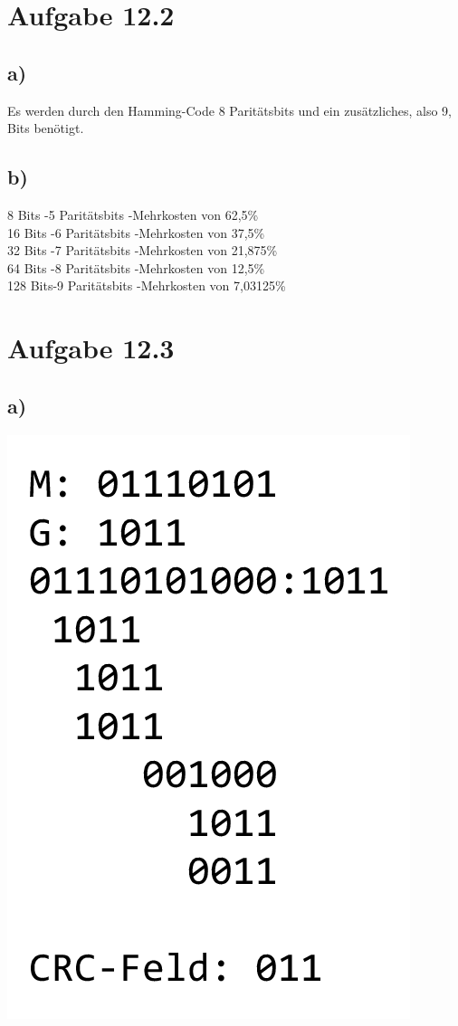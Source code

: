\documentclass{article}
\begin{document}
	\section*{Aufgabe 12.2}
	\subsection*{a)}
	Es werden durch den Hamming-Code 8 Paritätsbits und ein zusätzliches, also 9, Bits benötigt.
	\subsection*{b)}
	8 Bits    -5 Paritätsbits     -Mehrkosten von 62,5\% \\
	16 Bits    -6 Paritätsbits    -Mehrkosten von 37,5\% \\
	32 Bits    -7 Paritätsbits    -Mehrkosten von 21,875\% \\
	64 Bits    -8 Paritätsbits    -Mehrkosten von 12,5\% \\
	128 Bits-9 Paritätsbits    -Mehrkosten von 7,03125\% \\
	\section*{Aufgabe 12.3}
	\subsection*{a)}
	\includegraphics[width=\linewidth]{123a}
\end{document}
